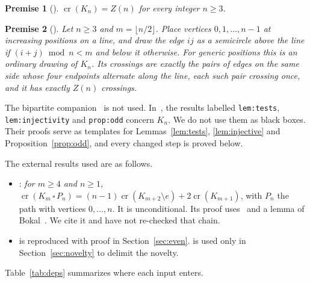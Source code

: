 \documentclass[11pt,a4paper]{article}
\newtheorem{premise}{Premise}
\theoremstyle{definition}
\theoremstyle{remark}
\numberwithin{equation}{section}
\newcommand{\crn}{\operatorname{cr}}
\begin{document}
\begin{premise}[{\cite[Theorem~1.1, label \texttt{thm:main}]{OAIKn}}]\label{U:HH}
$\crn(K_n)=Z(n)$ for every integer $n\ge3$.
\end{premise}

\begin{premise}[{\cite[Section~5 and Proposition~5.1, labels \texttt{sec:upper}, \texttt{prop:upper}]{OAIKn}}]\label{U:upper}
Let $n\ge3$ and $m=\lfloor n/2\rfloor$. Place vertices $0,1,\dots,n-1$ at increasing positions on a line, and draw the edge $ij$ as a semicircle above the line if $(i+j)\bmod n<m$ and below it otherwise. For generic positions this is an ordinary drawing of $K_n$. Its crossings are exactly the pairs of edges on the same side whose four endpoints alternate along the line, each such pair crossing once, and it has exactly $Z(n)$ crossings.
\end{premise}

The bipartite companion~\cite{OAIKmn} is not used. In~\cite{OAIKn}, the results labelled \texttt{lem:tests}, \texttt{lem:injectivity} and \texttt{prop:odd} concern $K_n$. We do not use them as black boxes. Their proofs serve as templates for Lemmas~\ref{lem:tests}, \ref{lem:injective} and Proposition~\ref{prop:odd}, and every changed step is proved below.

The external results used are as follows.
\begin{itemize}[leftmargin=1.5em]
\item \cite[Corollary~5.1]{OWH}: \emph{for $m\ge4$ and $n\ge1$, $\crn(K_m\,\square\,P_n)=(n-1)\crn(K_{m+2}\setminus e)+2\crn(K_{m+1})$}, with $P_n$ the path with vertices $0,\dots,n$. It is unconditional. Its proof uses~\cite[Theorems~5.1, 5.2 and Lemma~4.1]{OWH} and a lemma of Bokal~\cite{Bokal2007}. We cite it and have not re-checked that chain.
\item \cite[Theorem~3.2]{OWH} is reproduced with proof in Section~\ref{sec:even}. \cite[Theorem~3.1]{OWH} is used only in Section~\ref{sec:novelty} to delimit the novelty.
\end{itemize}

Table~\ref{tab:deps} summarizes where each input enters.
\end{document}
